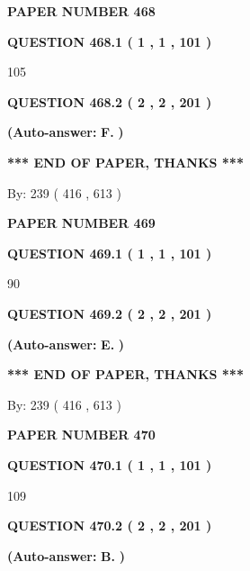 \documentclass{ctexart}
\begin{document}
   
 {\textbf{ \Large{ PAPER NUMBER  468  }}}
   
   
   
   
  
  
{\textbf{\large{QUESTION
468.1 
 ( 1 , 1 , 101 )
}}}

105
  
  
{\textbf{\large{QUESTION
468.2 
 ( 2 , 2 , 201 )
}}}
 
 
{\textbf{(Auto-answer:}}
{\textbf{\large{
F.}}}
{\textbf{)}}
 
 
   
   
   
   
\vspace{1.0in} 
{\textbf{\large{ *** END OF PAPER, THANKS *** }}} 
   
   
\hspace{1.0in} By: 
 239 ( 416 ,  613 )
   
   
   
   
\newpage 
\setcounter{page}{ 
   469001 } 
   
   
 {\textbf{ \Large{ PAPER NUMBER  469  }}}
   
   
   
   
  
  
{\textbf{\large{QUESTION
469.1 
 ( 1 , 1 , 101 )
}}}

90
  
  
{\textbf{\large{QUESTION
469.2 
 ( 2 , 2 , 201 )
}}}
 
 
{\textbf{(Auto-answer:}}
{\textbf{\large{
E.}}}
{\textbf{)}}
 
 
   
   
   
   
\vspace{1.0in} 
{\textbf{\large{ *** END OF PAPER, THANKS *** }}} 
   
   
\hspace{1.0in} By: 
 239 ( 416 ,  613 )
   
   
   
   
\newpage 
\setcounter{page}{ 
   470001 } 
   
   
 {\textbf{ \Large{ PAPER NUMBER  470  }}}
   
   
   
   
  
  
{\textbf{\large{QUESTION
470.1 
 ( 1 , 1 , 101 )
}}}

109
  
  
{\textbf{\large{QUESTION
470.2 
 ( 2 , 2 , 201 )
}}}
 
 
{\textbf{(Auto-answer:}}
{\textbf{\large{
B.}}}
{\textbf{)}}
 
\end{document}
